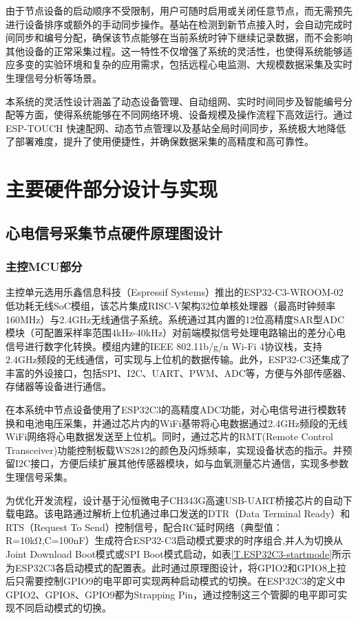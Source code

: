 由于节点设备的启动顺序不受限制，用户可随时启用或关闭任意节点，而无需预先进行设备排序或额外的手动同步操作。基站在检测到新节点接入时，会自动完成时间同步和编号分配，确保该节点能够在当前系统时钟下继续记录数据，而不会影响其他设备的正常采集过程。这一特性不仅增强了系统的灵活性，也使得系统能够适应多变的实验环境和复杂的应用需求，包括远程心电监测、大规模数据采集及实时生理信号分析等场景。

本系统的灵活性设计涵盖了动态设备管理、自动组网、实时时间同步及智能编号分配等方面，使得系统能够在不同网络环境、设备规模及操作流程下高效运行。通过ESP-TOUCH 快速配网、动态节点管理以及基站全局时间同步，系统极大地降低了部署难度，提升了使用便捷性，并确保数据采集的高精度和高可靠性。

\newpage    %

\section{主要硬件部分设计与实现}

\subsection{心电信号采集节点硬件原理图设计}

\subsubsection{主控MCU部分}

主控单元选用乐鑫信息科技（Espressif Systems）推出的ESP32-C3-WROOM-02低功耗无线SoC模组，该芯片集成RISC-V架构32位单核处理器（最高时钟频率160MHz）与2.4GHz无线通信子系统。系统通过其内置的12位高精度SAR型ADC模块（可配置采样率范围4kHz-40kHz）对前端模拟信号处理电路输出的差分心电信号进行数字化转换。模组内建的IEEE 802.11b/g/n Wi-Fi 4协议栈，支持2.4GHz频段的无线通信，可实现与上位机的数据传输。此外，ESP32-C3还集成了丰富的外设接口，包括SPI、I2C、UART、PWM、ADC等，方便与外部传感器、存储器等设备进行通信。

在本系统中节点设备使用了ESP32C3的高精度ADC功能，对心电信号进行模数转换和电池电压采集，并通过芯片内的WiFi基带将心电数据通过2.4GHz频段的无线WiFi网络将心电数据发送至上位机。同时，通过芯片的RMT(Remote Control Transceiver)功能控制板载WS2812的颜色及闪烁频率，实现设备状态的指示。并预留I2C接口，方便后续扩展其他传感器模块，如与血氧测量芯片通信，实现多参数生理信号采集。

为优化开发流程，设计基于沁恒微电子CH343G高速USB-UART桥接芯片的自动下载电路。该电路通过解析上位机通过串口发送的DTR（Data Terminal Ready）和RTS（Request To Send）控制信号，配合RC延时网络（典型值：R=10kΩ,C=100nF）生成符合ESP32-C3启动模式要求的时序组合,并人为切换从Joint Download Boot模式或SPI Boot模式启动，如表\ref{T.ESP32C3-startmode}所示为ESP32C3各启动模式的配置表。此时通过原理图设计，将GPIO2和GPIO8上拉后只需要控制GPIO9的电平即可实现两种启动模式的切换。在ESP32C3的定义中GPIO2、GPIO8、GPIO9都为Strapping Pin，通过控制这三个管脚的电平即可实现不同启动模式的切换。


